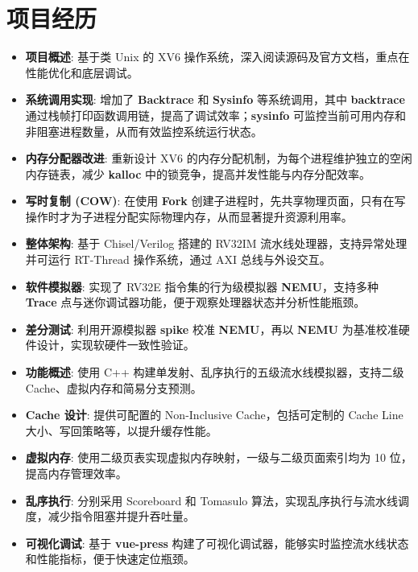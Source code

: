 \documentclass{resume}
\begin{document}

\section{项目经历}
\begin{itemize}[leftmargin=*]
    \item \textbf{项目概述}: 基于类 Unix 的 XV6 操作系统，深入阅读源码及官方文档，重点在性能优化和底层调试。  
    \item \textbf{系统调用实现}: 增加了 \textbf{Backtrace} 和 \textbf{Sysinfo} 等系统调用，其中 \textbf{backtrace} 通过栈帧打印函数调用链，提高了调试效率；\textbf{sysinfo} 可监控当前可用内存和非阻塞进程数量，从而有效监控系统运行状态。
    \item \textbf{内存分配器改进}: 重新设计 XV6 的内存分配机制，为每个进程维护独立的空闲内存链表，减少 \textbf{kalloc} 中的锁竞争，提高并发性能与内存分配效率。
    \item \textbf{写时复制 (COW)}: 在使用 \textbf{Fork} 创建子进程时，先共享物理页面，只有在写操作时才为子进程分配实际物理内存，从而显著提升资源利用率。
\end{itemize}

\begin{itemize}[leftmargin=*]
    \item \textbf{整体架构}: 基于 Chisel/Verilog 搭建的 RV32IM 流水线处理器，支持异常处理并可运行 RT-Thread 操作系统，通过 AXI 总线与外设交互。
    \item \textbf{软件模拟器}: 实现了 RV32E 指令集的行为级模拟器 \textbf{NEMU}，支持多种 \textbf{Trace} 点与迷你调试器功能，便于观察处理器状态并分析性能瓶颈。
    \item \textbf{差分测试}: 利用开源模拟器 \textbf{spike} 校准 \textbf{NEMU}，再以 \textbf{NEMU} 为基准校准硬件设计，实现软硬件一致性验证。
\end{itemize}

\begin{itemize}[leftmargin=*]
    \item \textbf{功能概述}: 使用 C++ 构建单发射、乱序执行的五级流水线模拟器，支持二级 Cache、虚拟内存和简易分支预测。
    \item \textbf{Cache 设计}: 提供可配置的 Non-Inclusive Cache，包括可定制的 Cache Line 大小、写回策略等，以提升缓存性能。
    \item \textbf{虚拟内存}: 使用二级页表实现虚拟内存映射，一级与二级页面索引均为 10 位，提高内存管理效率。
    \item \textbf{乱序执行}: 分别采用 Scoreboard 和 Tomasulo 算法，实现乱序执行与流水线调度，减少指令阻塞并提升吞吐量。
    \item \textbf{可视化调试}: 基于 \textbf{vue-press} 构建了可视化调试器，能够实时监控流水线状态和性能指标，便于快速定位瓶颈。
\end{itemize}
\end{document}
